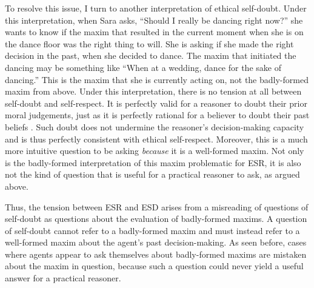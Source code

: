 \begin{isabellebody}
\begin{isamarkuptext}
To resolve this issue, I turn to another interpretation of ethical self-doubt. Under this interpretation, 
when Sara asks, ``Should I really be dancing right now?'' she wants to know if the maxim that 
resulted in the current moment when she is on the dance floor was the right thing to will. She is 
asking if she made the right decision in the past, when she decided to dance. The maxim that initiated 
the dancing may be something like ``When at a wedding, dance for the sake of dancing.'' This is the maxim 
that she is currently acting on, not the badly-formed maxim  from above. Under this interpretation, 
there is no tension at all between self-doubt and self-respect. It is perfectly valid for a reasoner 
to doubt their prior moral judgements, just as it is perfectly rational for a believer to doubt their 
past beliefs \cite[3-4]{christensen}. Such doubt does not undermine the reasoner's decision-making 
capacity and is thus perfectly consistent with ethical self-respect. Moreover, this is a much more 
intuitive question to be asking \emph{because} it is a well-formed maxim. Not only is the badly-formed
interpretation of this maxim problematic for ESR, it is also not the kind of question that is useful for a practical
reasoner to ask, as argued above.

Thus, the tension between ESR and ESD arises from a misreading of questions of self-doubt as questions about 
the evaluation of badly-formed maxims. A question of self-doubt cannot refer to a badly-formed maxim and must 
instead refer to a well-formed maxim about the agent's past decision-making. As seen before, cases where 
agents appear to ask themselves about badly-formed maxims are mistaken about the maxim in question, because 
such a question could never yield a useful answer for a practical reasoner. 


\end{isamarkuptext}
\end{isabellebody}
